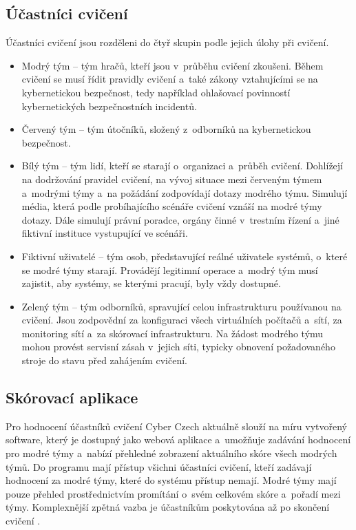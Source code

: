 \documentclass[
  digital,
  twoside,
  table, 
  nolof, 
  nolot
]{fithesis3}
\begin{document}
\subsection{Účastníci cvičení}
Účastníci cvičení jsou rozděleni do čtyř skupin podle jejich úlohy při cvičení.

\begin{itemize}
\item Modrý tým -- tým hračů, kteří jsou v~průběhu cvičení zkoušeni. Během cvičení se musí řídit pravidly cvičení a~také zákony vztahujícími se na kybernetickou bezpečnost, tedy například ohlašovací povinností kybernetických bezpečnostních incidentů.
\item Červený tým -- tým útočníků, složený z~odborníků na kybernetickou bezpečnost. 
\item Bílý tým -- tým lidí, kteří se starají o~organizaci a~průběh cvičení. Dohlížejí na dodržování pravidel cvičení, na vývoj situace mezi červeným týmem a~modrými týmy a~na požádání zodpovídají dotazy modrého týmu. Simulují média, která podle probíhajícího scénáře cvičení vznáší na modré týmy dotazy. Dále simulují právní poradce, orgány činné v~trestním řízení a~jiné fiktivní instituce vystupující ve scénáři.
\item Fiktivní uživatelé -- tým osob, představující reálné uživatele systémů, o~které se modré týmy starají. Provádějí legitimní operace a~modrý tým musí zajistit, aby systémy, se kterými pracují, byly vždy dostupné.
\item Zelený tým -- tým odborníků, spravující celou infrastrukturu používanou na cvičení. Jsou zodpovědní za konfiguraci všech virtuálních počítačů a~sítí, za monitoring sítí a~za skórovací infrastrukturu. Na žádost modrého týmu mohou provést servisní zásah v~jejich síti, typicky obnovení požadovaného stroje do stavu před zahájením cvičení.
\end{itemize}

\subsection{Skórovací aplikace}
Pro hodnocení účastníků cvičení Cyber Czech aktuálně slouží na míru vytvořený software, který je dostupný jako webová aplikace a~umožňuje zadávání hodnocení pro modré týmy a~nabízí přehledné zobrazení aktuálního skóre všech modrých týmů. Do programu mají přístup všichni účastníci cvičení, kteří zadávají hodnocení za modré týmy, které do systému přístup nemají. Modré týmy mají pouze přehled prostřednictvím promítání o~svém celkovém skóre a~pořadí mezi týmy. Komplexnější zpětná vazba je účastníkům poskytována až po skončení cvičení \cite{Vykopal2017TimelyExercises}.
\end{document}
